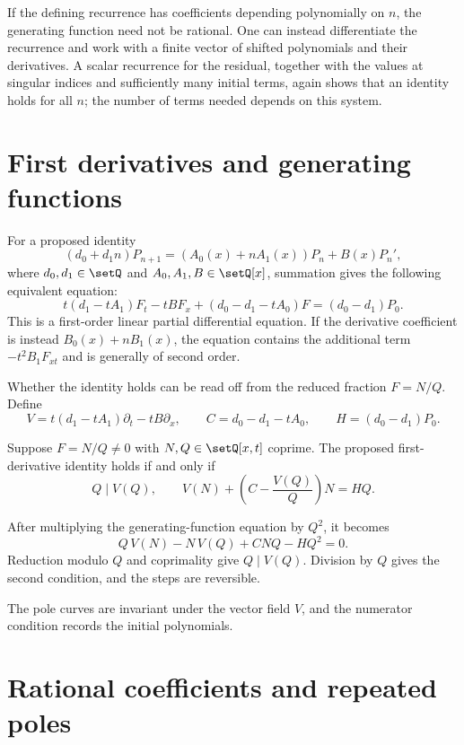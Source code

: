 If the defining recurrence has coefficients depending polynomially on $n$,
the generating function need not be rational. One can instead differentiate
the recurrence and work with a finite vector of shifted polynomials and
their derivatives. A scalar recurrence for the residual, together with the
values at singular indices and sufficiently many initial terms, again shows
that an identity holds for all $n$; the number of terms needed depends on
this system.


\section[recurrenceGeneratingFunctions]{First derivatives and generating functions}

For a proposed identity
\[
 (d_0+d_1n)P_{n+1}
 =(A_0(x)+nA_1(x))P_n+B(x)P_n',
\]
where $d_0,d_1\in\setQ$ and $A_0,A_1,B\in\setQ[x]$, summation gives the
following equivalent equation:
\[
 t(d_1-tA_1)F_t-tBF_x+(d_0-d_1-tA_0)F=(d_0-d_1)P_0.
\]
This is a first-order linear partial differential equation. If the derivative
coefficient is instead $B_0(x)+nB_1(x)$, the equation contains the additional
term $-t^2B_1F_{xt}$ and is generally of second order.

Whether the identity holds can be read off from the reduced fraction
$F=N/Q$. Define
\[
 V=t(d_1-tA_1)\partial_t-tB\partial_x,\qquad
 C=d_0-d_1-tA_0,\qquad H=(d_0-d_1)P_0.
\]

\begin{proposition}
Suppose $F=N/Q\ne0$ with $N,Q\in\setQ[x,t]$ coprime. The proposed
first-derivative identity holds if and only if
\[
 Q\mid V(Q),\qquad
 V(N)+\left(C-\frac{V(Q)}{Q}\right)N=HQ.
\]
\end{proposition}

\begin{proof*}
After multiplying the generating-function equation by $Q^2$, it becomes
\[
 Q\,V(N)-N\,V(Q)+CNQ-HQ^2=0.
\]
Reduction modulo $Q$ and coprimality give $Q\mid V(Q)$.
Division by $Q$ gives the second condition, and the steps are reversible.
\end{proof*}

The pole curves are invariant under the vector field $V$, and the numerator
condition records the initial polynomials.

\section[recurrenceSpectralModel]{Rational coefficients and repeated poles}

